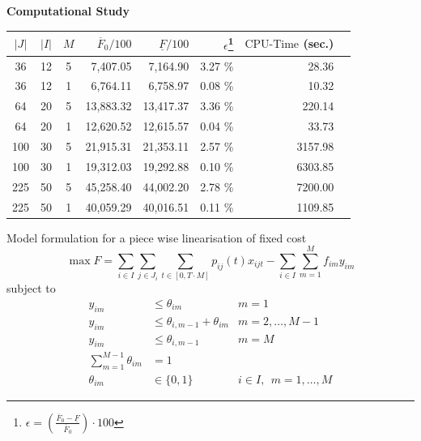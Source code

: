 \begin{frame}{\textbf{Computational Study}}
\begin{center}
    \small
    \begin{tabular}{cccrrrrr}
    \toprule
        $|J|$ & $|I|$ & $M$ & $\overline{F}_0/100$ & $\underline{F}/100$ & $\epsilon$\footnote{$\epsilon=\left(\frac{\overline{F}_0-\underline{F}}{\overline{F}_0} \right) \cdot 100$} &  $\text{CPU-Time}$ (sec.)  \\ \midrule
        36 & 12 & 5 & 7,407.05 & 7,164.90 & 3.27 \%  & 28.36 \\
        36 & 12 & 1 & 6,764.11 & 6,758.97 & 0.08 \%   & 10.32  \\ \midrule
        64 & 20 & 5 & 13,883.32 & 13,417.37 & 3.36 \%  & 220.14  \\
        64 & 20 & 1 & 12,620.52 & 12,615.57 & 0.04 \% & 33.73 \\ \midrule
        100 & 30 & 5 & 21,915.31 & 21,353.11 & 2.57 \%  & 3157.98 \\
        100 & 30 & 1 & 19,312.03 & 19,292.88 & 0.10 \%  & 6303.85 \\ \midrule 
        225 & 50 & 5 & 45,258.40 & 44,002.20 & 2.78 \%  & 7200.00  \\
        225 & 50 & 1 & 40,059.29 & 40,016.51 & 0.11 \%  & 1109.85  \\ \bottomrule
    \end{tabular}
\end{center}
\end{frame}

\begin{frame}{Model formulation for a piece wise linearisation of fixed cost }
    \begin{equation}
        \max F = \sum_{i \in I} \sum_{j \in J_i} \sum_{t \in [0,T \cdot M]} p_{ij}(t)  x_{ijt} - \sum_{i \in I} \sum_{m=1}^M f_{im} y_{im}
    \end{equation}
    subject to
    \begin{align}
        y_{im} &\leq \theta_{im} & m = 1 \\
        y_{im} &\leq \theta_{i,m-1} + \theta_{im}  & m = 2,\dots,M-1 \\
        y_{im} &\leq \theta_{i,m-1} & m = M \\
        \sum_{m=1}^{M-1} \theta_{im} &= 1 & \\
        \theta_{im} &\in \{0,1\} & i \in I, \ \ m = 1,\dots,M
    \end{align}
\end{frame}

